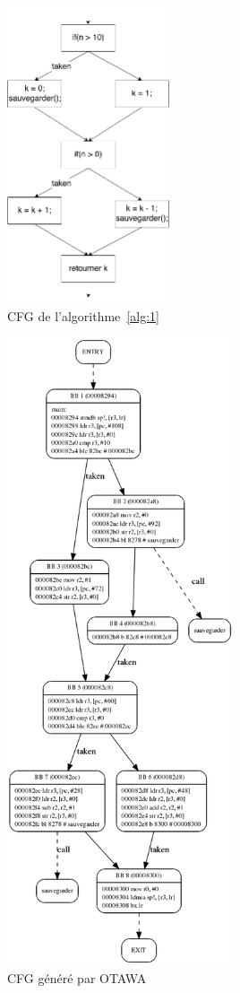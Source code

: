 \documentclass[french]{article}
\begin{document}
  \begin{figure}
    \centering
    \includegraphics[height=330px]{pictures/cfg.png}
    \caption{CFG de l'algorithme~\ref{alg:1}}
    \label{cfg}
  \end{figure}

  \begin{figure}
    \centering
    \includegraphics[height=525pt]{pictures/cfg_genere.png}
    \caption{CFG généré par OTAWA}
    \label{cfg_genere}
  \end{figure}
\end{document}
